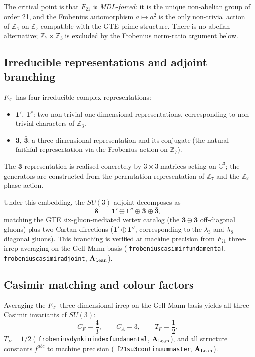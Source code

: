 \documentclass[11pt]{article}
\theoremstyle{remark}
\newcommand{\ZS}{\mathbb{Z}_7}
\newcommand{\ZZ}{\mathbb{Z}}
\newcommand{\Ftwentyone}{F_{21}}
\newcommand{\lean}[1]{%
  \penalty-100
  \begingroup\def\_{\textunderscore\allowbreak}\texttt{#1}\endgroup}
\newcommand{\CatAL}{\ensuremath{\textbf{A}_{\rm Lean}}}
\begin{document}
The critical point is that $\Ftwentyone$ is \emph{MDL-forced}: it is the unique
non-abelian group of order 21, and the Frobenius automorphism $a \mapsto a^2$
is the only non-trivial action of $\ZZ_3$ on $\ZS$ compatible with the GTE
prime structure.
There is no abelian alternative; $\ZS \times \ZZ_3$ is excluded by the
Frobenius norm-ratio argument below.

\subsection{Irreducible representations and adjoint branching}
\label{ssec:irreps}

$\Ftwentyone$ has four irreducible complex representations:
\begin{itemize}[leftmargin=2em]
\item $\mathbf{1}'$, $\mathbf{1}''$: two non-trivial one-dimensional representations,
  corresponding to non-trivial characters of $\ZZ_3$.
\item $\mathbf{3}$, $\bar{\mathbf{3}}$: a three-dimensional representation and its
  conjugate (the natural faithful representation via the Frobenius action on $\ZS$).
\end{itemize}
The $\mathbf{3}$ representation is realised concretely by $3 \times 3$ matrices
acting on $\mathbb{C}^3$; the generators are constructed from the permutation
representation of $\ZS$ and the $\ZZ_3$ phase action.

Under this embedding, the $SU(3)$ adjoint decomposes as
\begin{equation}
  \mathbf{8} \;=\; \mathbf{1}' \oplus \mathbf{1}'' \oplus \mathbf{3} \oplus \bar{\mathbf{3}},
  \label{eq:adjbranch}
\end{equation}
matching the GTE six-gluon-mediated vertex catalog (the $\mathbf{3} \oplus
\bar{\mathbf{3}}$ off-diagonal gluons) plus two Cartan directions
($\mathbf{1}' \oplus \mathbf{1}''$, corresponding to the $\lambda_3$ and
$\lambda_8$ diagonal gluons).
This branching is verified at machine precision from $\Ftwentyone$ three-irrep
averaging on the Gell-Mann basis
(\lean{frobenius\_casimir\_fundamental}, \lean{frobenius\_casimir\_adjoint},
\CatAL{}).

\subsection{Casimir matching and colour factors}
\label{ssec:casimir}

Averaging the $\Ftwentyone$ three-dimensional irrep on the Gell-Mann basis
yields all three Casimir invariants of $SU(3)$:
\begin{equation}
  C_F = \frac{4}{3},
  \qquad
  C_A = 3,
  \qquad
  T_F = \frac{1}{2},
  \label{eq:casimirs}
\end{equation}
$T_F = 1/2$ (\lean{frobenius\_dynkin\_index\_fundamental}, \CatAL{}),
and all structure constants $f^{abc}$ to machine precision
(\lean{f21\_su3\allowbreak\_continuum\_master}, \CatAL{}).
\end{document}
